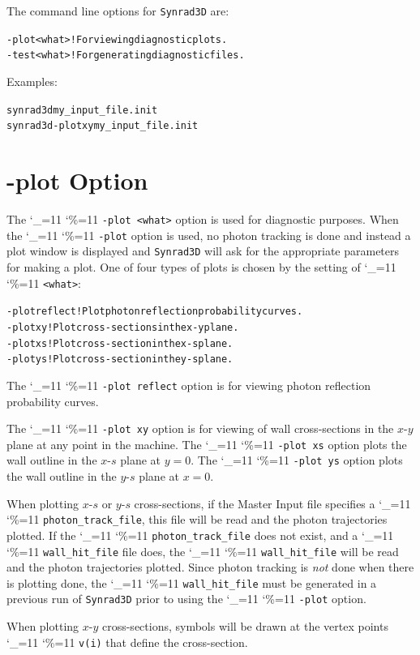 \documentclass[11pt,openany]{report}
\newcommand{\srthree}{\texttt{Synrad3D}\xspace}
\newcommand\ttcmd{\begingroup\catcode`\_=11 \catcode`\%=11 \dottcmd}
\newcommand\dottcmd[1]{\texttt{#1}\endgroup}
\newcommand{\vn}{\ttcmd}
\newlength{\ExBeg}
\newlength{\ExEnd}
\newenvironment{example}
  {\vspace{\ExBeg} \begin{alltt}}
  {\end{alltt} \vspace{\ExEnd}}
\begin{document}
The command line options for \srthree are:
\begin{example}
  -plot <what>  ! For viewing diagnostic plots.
  -test <what>  ! For generating diagnostic files.
\end{example}

Examples:
\begin{example}
  synrad3d my_input_file.init
  synrad3d -plot xy  my_input_file.init
\end{example}

\section{-plot Option}
\label{s:plot.option}

The \vn{-plot <what>} option is used for diagnostic purposes. When the
\vn{-plot} option is used, no photon tracking is done and instead a
plot window is displayed and \srthree will ask for the appropriate
parameters for making a plot. One of four types of plots is chosen by
the setting of \vn{<what>}:
\begin{example}
  -plot reflect ! Plot photon reflection probability curves.
  -plot xy      ! Plot cross-sections in the x-y plane.
  -plot xs      ! Plot cross-section in the x-s plane.
  -plot ys      ! Plot cross-section in the y-s plane.
\end{example}

The \vn{-plot reflect} option is for viewing photon reflection
probability curves. 

The \vn{-plot xy} option is for viewing of wall
cross-sections in the $x$-$y$ plane at any point in the machine. The
\vn{-plot xs} option plots the wall outline in the $x$-$s$ plane at $y
= 0$. The \vn{-plot ys} option plots the wall outline in the $y$-$s$
plane at $x = 0$. 

When plotting $x$-$s$ or $y$-$s$ cross-sections, if the Master Input file specifies a
\vn{photon_track_file}, this file will be read and the photon trajectories plotted.  If
the \vn{photon_track_file} does not exist, and a \vn{wall_hit_file} file does, the
\vn{wall_hit_file} will be read and the photon trajectories plotted. Since photon tracking
is {\em not} done when there is plotting done, the \vn{wall_hit_file} must be generated in
a previous run of \srthree prior to using the \vn{-plot} option.

When plotting $x$-$y$ cross-sections, symbols
will be drawn at the vertex points \vn{v(i)} that define the
cross-section.
\end{document}
